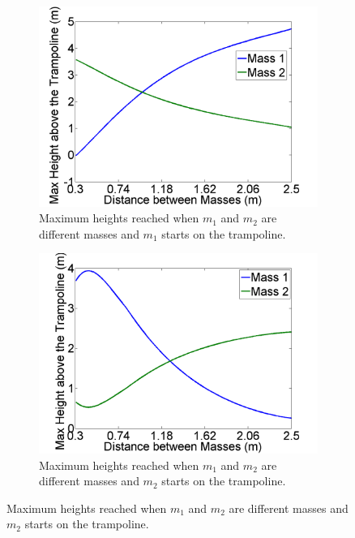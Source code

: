 \begin{figure}[H]
	\centering
    \begin{subfigure}[t]{0.3\textwidth}
		\includegraphics[width=\textwidth]{m1_on_tramp_different_masses_timestep_125.png}
    	\caption{Maximum heights reached when $m_1$ and $m_2$ are different masses and $m_1$ starts on the trampoline.}\label{fig:m1_on_tramp_different_masses_timestep_125}
    \end{subfigure}\hfill
	\begin{subfigure}[t]{0.3\textwidth}
		\includegraphics[width=\textwidth]{m2_on_tramp_different_masses_timestep_125.png}
    	\caption{Maximum heights reached when $m_1$ and $m_2$ are different masses and $m_2$ starts on the trampoline.}\label{fig:m2_on_tramp_different_masses_timestep_125}
    \end{subfigure}\hfill

\end{figure}
